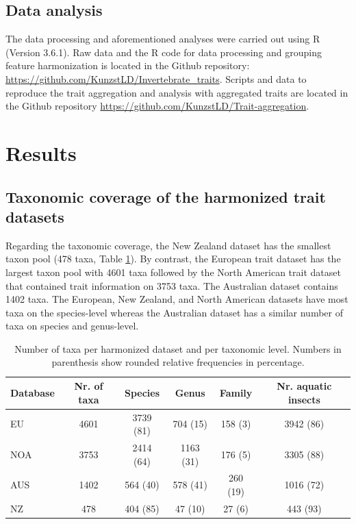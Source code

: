 \documentclass{article}
\begin{document}

\subsection*{Data analysis}

The data processing and aforementioned analyses were carried out using R (Version 3.6.1). Raw data and the R code for data processing and grouping feature harmonization is located in the Github repository: \url{https://github.com/KunzstLD/Invertebrate_traits}. Scripts and data to reproduce the trait aggregation and analysis with aggregated traits are located in the Github repository \url{https://github.com/KunzstLD/Trait-aggregation}.


\section*{Results}

\subsection*{Taxonomic coverage of the harmonized trait datasets}

Regarding the taxonomic coverage, the New Zealand dataset has the smallest taxon pool (478 taxa, Table \ref{tab:tax_coverage}). By contrast, the European trait dataset has the largest taxon pool with 4601 taxa followed by the North American trait dataset that contained trait information on 3753 taxa. The Australian dataset contains 1402 taxa. The European, New Zealand, and North American datasets have most taxa on the species-level whereas the Australian dataset has a similar number of taxa on species and genus-level.

\begin{table}[ht]
    \centering
    \caption{Number of taxa per harmonized dataset and per taxonomic level. Numbers in parenthesis show rounded relative frequencies in percentage.} 
    \label{tab:tax_coverage}
    \begin{tabular}{lccccc}
    \toprule[.1em]
    Database & Nr. of taxa & Species & Genus & Family & Nr. aquatic insects \\ 
    \toprule[.1em]
    EU & 4601 & 3739 (81) & 704 (15) & 158 (3) & 3942 (86) \\ 
    NOA & 3753 & 2414 (64) & 1163 (31) & 176 (5) & 3305 (88) \\ 
    AUS & 1402 & 564 (40) & 578 (41) & 260 (19) & 1016 (72) \\ 
    NZ & 478 & 404 (85) & 47 (10) & 27 (6) & 443 (93) \\ 
    \bottomrule
    \end{tabular}
\end{table}
\end{document}

